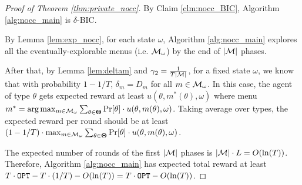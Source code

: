\begin{proof}[Proof of Theorem \ref{thm:private_nocc}]
By Claim \ref{clm:nocc_BIC}, Algorithm \ref{alg:nocc_main} is $\delta$-BIC.

By Lemma \ref{lem:exp_nocc}, for each state $\omega$, Algorithm \ref{alg:nocc_main} explores all the eventually-explorable menus (i.e. $\mathcal{M}_{\omega}$) by the end of $|\mathcal{M}|$ phases.

After that, by Lemma \ref{lem:deltam} and $\gamma_2 = \frac{1}{T|\mathcal{M}|}$, for a fixed state $\omega$, we know that with probability $1- 1/T$, $\delta_m = D_m$ for all $m \in \mathcal{M}_{\omega}$. In this case, the agent of type $\theta$ gets expected reward at least $u(\theta,m^*(\theta),\omega)$ where menu $m^* =\arg\max_{m \in \mathcal{M}_{\omega}} \sum_{\theta \in \bold{\Theta}} \Pr[\theta] \cdot u(\theta, m(\theta), \omega)$. Taking average over types, the expected reward per round should be at least $(1-1/T) \cdot \max_{m \in \mathcal{M}_{\omega}} \sum_{\theta \in \bold{\Theta}} \Pr[\theta] \cdot u(\theta, m(\theta), \omega)$.

The expected number of rounds of the first $|\mathcal{M}|$ phases is $|\mathcal{M}| \cdot L = O(\ln(T))$. Therefore, Algorithm \ref{alg:nocc_main} has expected total reward at least $T \cdot \mathtt{OPT}- T \cdot (1/T) - O(\ln(T)) = T\cdot \mathtt{OPT} - O(\ln(T))$.
\end{proof}


